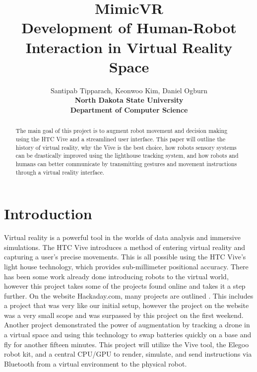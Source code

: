 \documentclass[10pt,a4paper]{article}
\title{\textbf{\Huge MimicVR \\
	\Large  Development of Human-Robot Interaction in Virtual Reality Space}}
\author{Santipab Tipparach, Keonwoo Kim, Daniel Ogburn\\
	\textbf{North Dakota State University}\\\textbf{Department of Computer Science}}
\begin{document}
\maketitle


\begin{abstract}

	The main goal of this project is to augment robot movement and decision making using the HTC Vive and a streamlined user interface. This paper will outline the history of virtual reality, why the Vive is the best choice, how robots sensory systems can be drastically improved using the lighthouse tracking system, and how robots and humans can better communicate by transmitting gestures and movement instructions through a virtual reality interface.

\end{abstract}

	\section*{Introduction}
	Virtual reality is a powerful tool in the worlds of data analysis and immersive simulations. The HTC Vive introduces a method of entering virtual reality and capturing a user's precise movements. This is all possible using the HTC Vive's light house technology, which provides sub-millimeter positional accuracy. There has been some work already done introducing robots to the virtual world, however this project takes some of the projects found online and takes it a step further. On the website Hackaday.com, many projects are outlined \cite{hack1}. This includes a project that was very like our initial setup, however the project on the website was a very small scope and was surpassed by this project on the first weekend. Another project demonstrated the power of augmentation by tracking a drone in a virtual space and using this technology to swap batteries quickly on a base and fly for another fifteen minutes. This project will utilize the Vive tool, the Elegoo robot kit, and a central CPU/GPU to render, simulate, and send instructions via Bluetooth from a virtual environment to the physical robot.
\end{document}
